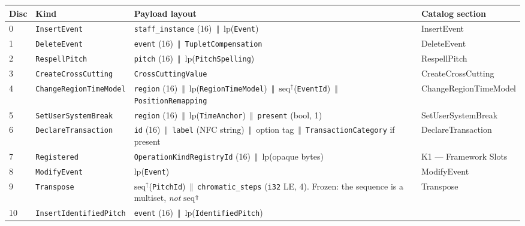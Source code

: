 \documentclass[11pt,letterpaper]{report}
\newcommand{\tablenums}[1]{{\addfontfeatures{Numbers={Lining,Tabular}}#1}}
\newcommand{\sectionsc}[1]{{\addfontfeatures{Letters=SmallCaps}#1}}
\newcommand{\cat}{\ensuremath{\,\Vert\,}}
\begin{document}
\begingroup\footnotesize
\begin{longtable}{p{0.32in} >{\raggedright\arraybackslash}p{1.5in} >{\raggedright\arraybackslash}p{2.35in} >{\raggedright\arraybackslash}p{1.35in}}
  \toprule
  \textbf{Disc} & \textbf{Kind} & \textbf{Payload layout} &
    \textbf{Catalog section} \\
  \midrule
  \endhead
  \tablenums{0} & \texttt{InsertEvent} &
    \texttt{staff\_instance} (16) \cat{} $\mathrm{lp}$(\texttt{Event}) &
    \sectionsc{InsertEvent} \\
  \tablenums{1} & \texttt{DeleteEvent} &
    \texttt{event} (16) \cat{} \texttt{TupletCompensation} &
    \sectionsc{DeleteEvent} \\
  \tablenums{2} & \texttt{RespellPitch} &
    \texttt{pitch} (16) \cat{} $\mathrm{lp}$(\texttt{PitchSpelling}) &
    \sectionsc{RespellPitch} \\
  \tablenums{3} & \texttt{CreateCrossCutting} &
    \texttt{CrossCuttingValue} &
    \sectionsc{CreateCrossCutting} \\
  \tablenums{4} & \texttt{ChangeRegionTimeModel} &
    \texttt{region} (16) \cat{} $\mathrm{lp}$(\texttt{RegionTimeModel})
    \cat{} $\mathrm{seq}^{\uparrow}$(\texttt{EventId}) \cat{}
    \texttt{PositionRemapping} &
    \sectionsc{ChangeRegion\allowbreak TimeModel} \\
  \tablenums{5} & \texttt{SetUserSystemBreak} &
    \texttt{region} (16) \cat{} $\mathrm{lp}$(\texttt{TimeAnchor}) \cat{}
    \texttt{present} (bool, 1) &
    \sectionsc{SetUserSystemBreak} \\
  \tablenums{6} & \texttt{DeclareTransaction} &
    \texttt{id} (16) \cat{} \texttt{label} (NFC string) \cat{} option tag
    \cat{} \texttt{TransactionCategory} if present &
    \sectionsc{DeclareTransaction} \\
  \tablenums{7} & \texttt{Registered} &
    \texttt{OperationKindRegistryId} (16) \cat{}
    $\mathrm{lp}$(opaque bytes) &
    \sectionsc{K1 --- Framework Slots} \\
  \tablenums{8} & \texttt{ModifyEvent} &
    $\mathrm{lp}$(\texttt{Event}) &
    \sectionsc{ModifyEvent} \\
  \tablenums{9} & \texttt{Transpose} &
    $\mathrm{seq}^{\uparrow}$(\texttt{PitchId}) \cat{}
    \texttt{chromatic\_steps} (\texttt{i32} LE, 4). Frozen: the sequence is a
    multiset, \emph{not} $\mathrm{seq}^{\Uparrow}$ &
    \sectionsc{Transpose} \\
  \tablenums{10} & \texttt{InsertIdentifiedPitch} &
    \texttt{event} (16) \cat{} $\mathrm{lp}$(\texttt{IdentifiedPitch}) &

\end{longtable}
\end{document}
